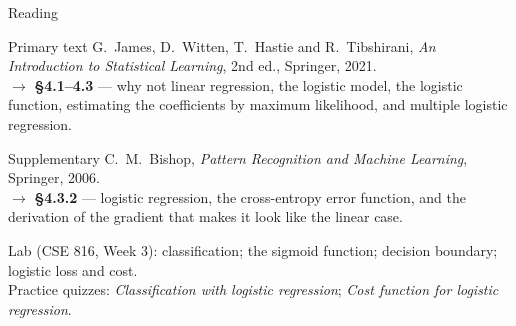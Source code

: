 \documentclass[aspectratio=169,10pt]{beamer}
\begin{document}
\begin{frame}{Reading}
  \begin{block}{Primary text}
    G.~James, D.~Witten, T.~Hastie and R.~Tibshirani,
    \emph{An Introduction to Statistical Learning}, 2nd ed., Springer, 2021.\\[2pt]
    \hfill{\small$\rightarrow$ \textbf{\S4.1--4.3} --- why not linear regression, the logistic
    model, the logistic function, estimating the coefficients by maximum likelihood, and
    multiple logistic regression.}
  \end{block}
  \begin{block}{Supplementary}
    C.~M.~Bishop, \emph{Pattern Recognition and Machine Learning}, Springer, 2006.\\[2pt]
    \hfill{\small$\rightarrow$ \textbf{\S4.3.2} --- logistic regression, the cross-entropy
    error function, and the derivation of the gradient that makes it look like the linear
    case.}
  \end{block}
  \vspace{2mm}
  \begin{center}
    \small\color{cugray}
    Lab (CSE 816, Week 3): classification; the sigmoid function; decision boundary;
    logistic loss and cost.\\
    Practice quizzes: \emph{Classification with logistic regression}; \emph{Cost function for
    logistic regression}.
  \end{center}
\end{frame}
\end{document}
